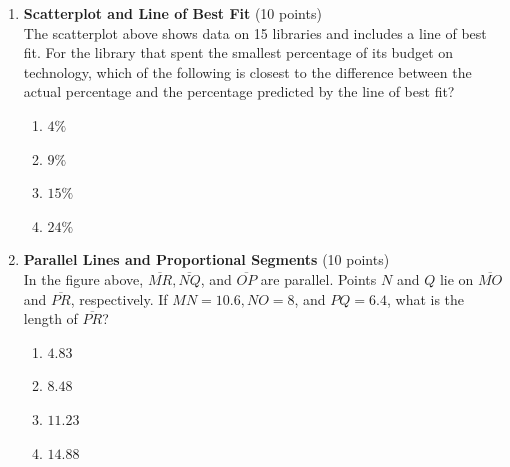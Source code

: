 \begin{enumerate}
  \newpage

  \item \textbf{Scatterplot and Line of Best Fit} (10 points)\\
  The scatterplot above shows data on 15 libraries and includes a line of best fit. For the library that spent the smallest percentage of its budget on technology, which of the following is closest to the difference between the actual percentage and the percentage predicted by the line of best fit?
  \begin{enumerate}[label=(\Alph*)]
    \item $4\%$
    \item $9\%$
    \item $15\%$
    \item $24\%$
  \end{enumerate}
  \begin{subanswer}
  \end{subanswer}



  \newpage







  \item \textbf{Parallel Lines and Proportional Segments} (10 points)\\
  In the figure above, $\overline{M R}, \overline{N Q}$, and $\overline{O P}$ are 
  parallel. Points $N$ and $Q$ lie on $\overline{M O}$ and $\overline{P R}$, 
  respectively. If $M N=10.6, N O=8$, and $P Q=6.4$, what is the length of $\overline{P R}$?
  \begin{enumerate}[label=(\Alph*)]
    \item $4.83$
    \item $8.48$
    \item $11.23$
    \item $14.88$
  \end{enumerate}
  \begin{subanswer}
  \end{subanswer}


\end{enumerate}
